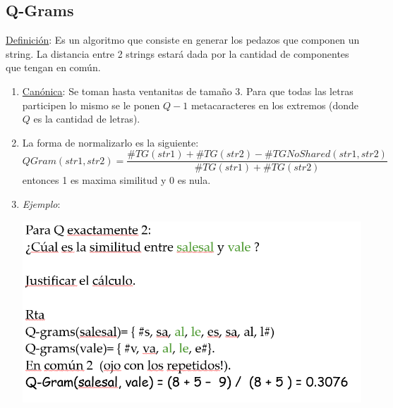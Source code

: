 \documentclass{article}
\begin{document}
\subsection{Q-Grams}
\underline{Definición}: Es un algoritmo que consiste en generar los pedazos que componen un string. La distancia entre 2 strings estará dada por la cantidad de componentes que tengan en común.
\begin{enumerate}
    \item \underline{Canónica}: 
    \subitem Se toman hasta ventanitas de tamaño 3.
    \subitem Para que todas las letras participen lo mismo se le ponen $Q - 1$ metacaracteres en los extremos (donde $Q$ es la cantidad de letras).
    \item La forma de normalizarlo es la siguiente:
    \begin{equation*}
        QGram(str1, str2) = \frac{\#TG(str1) + \#TG(str2) - \#TGNoShared(str1, str2)}{\#TG(str1) + \#TG(str2)}
    \end{equation*}
    entonces 1 es maxima similitud y 0 es nula.
    \item \emph{Ejemplo}:
    \begin{center}
        \includegraphics[width=.50\textwidth]{Images/QGramEj.png}
    \end{center}
\end{enumerate}
\end{document}
